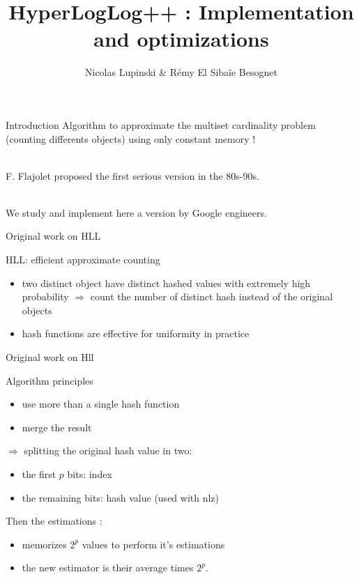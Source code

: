 \documentclass{beamer}
\title{HyperLogLog++ : Implementation and optimizations}
\author{Nicolas Lupinski \& Rémy El Sibaïe Besognet}
\begin{document}
\begin{frame}
  \titlepage  
\end{frame}

\begin{frame}{Introduction}
  Algorithm to approximate the multiset cardinality problem (counting
  differents objects) using only constant memory !
  
  ~\\

  F. Flajolet proposed the first serious version in the 80s-90s.
  
  ~\\
  
  We study and implement here a version by Google engineers.
  
\end{frame}
  
\begin{frame}{Original work on HLL}

  
  \begin{block}{HLL: efficient approximate counting}  
    \begin{itemize}
    \item two distinct object have distinct hashed values with
      extremely high probability $\Rightarrow$ count the number of distinct
      hash instead of the original objects
    \item hash functions are effective for uniformity in practice
    \end{itemize}
  \end{block}


  
\end{frame}
\begin{frame}{Original work on Hll}
  \begin{block}{Algorithm principles}
    \begin{itemize}
    \item use more than a single hash function
    \item merge the result
    \end{itemize}

    $\Rightarrow$ splitting the original hash value in two: 
    \begin{itemize}
    \item the first $p$ bits: index
    \item the remaining bits: hash value (used with nlz)
    \end{itemize}

    Then the estimations :

    \begin{itemize}
    \item memorizes $2^{p}$ values to perform it's estimations
    \item the new estimator is their average times $2^{p}$.
    \end{itemize}
  \end{block}
\end{frame}
\end{document}
